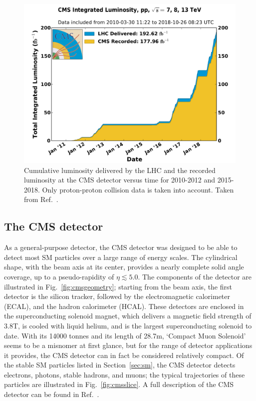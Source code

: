 \begin{figure}[hbtp]
  \begin{center}
    \includegraphics[width=0.7\linewidth]{img/detector/cmslumi.pdf}
    \caption{
        Cumulative luminosity delivered by the LHC and the recorded luminosity at the CMS detector versus time for 2010-2012 and 2015-2018.
        Only proton-proton collision data is taken into account.
        Taken from Ref.~\cite{cmslumi}.
        }
    \label{fig:cmslumi}
  \end{center}
\end{figure}


\subsection{The CMS detector}
\label{sec:cmsdetector}

As a general-purpose detector, the CMS detector was designed to be able to detect most SM particles over a large range of energy scales.
% 
The cylindrical shape, with the beam axis at its center, provides a nearly complete solid angle coverage, up to a pseudo-rapidity of $\eta \lesssim 5.0$.
% 
The components of the detector are illustrated in Fig.~\ref{fig:cmsgeometry}; starting from the beam axis, the first detector is the silicon tracker, followed by the electromagnetic calorimeter (ECAL), and the hadron calorimeter (HCAL).
% 
These detectors are enclosed in the superconducting solenoid magnet, which delivers a magnetic field strength of 3.8\unit{T}, is cooled with liquid helium, and is the largest superconducting solenoid to date.
% 
With its 14000 tonnes and its length of 28.7\unit{m}, `Compact Muon Solenoid' seems to be a misnomer at first glance, but for the range of detector applications it provides, the CMS detector can in fact be considered relatively compact.
% 
Of the stable SM particles listed in Section~\ref{sec:sm}, the CMS detector detects electrons, photons, stable hadrons, and muons; the typical trajectories of these particles are illustrated in Fig.~\ref{fig:cmsslice}.
% 
A full description of the CMS detector can be found in Ref.~\cite{Chatrchyan:2008zzk}.


